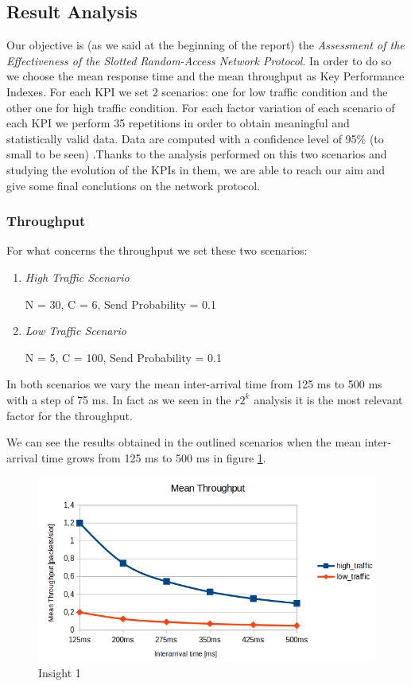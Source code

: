 \subsection{Result Analysis}
Our objective is (as we said at the beginning of the report) the \textit{Assessment of the Effectiveness of the Slotted Random-Access Network Protocol}. In order to do so we choose the mean response time and the mean throughput as Key Performance Indexes. For each KPI we set 2 scenarios: one for low traffic condition and the other one for high traffic condition. For each factor variation of each scenario of each KPI we perform 35 repetitions in order to obtain meaningful and statistically valid data. Data are computed with a confidence level of 95\% (to small to be seen) .Thanks to the analysis performed on this two scenarios and studying the evolution of the KPIs in them, we are able to reach our aim and give some final conclutions on the network protocol. 

\subsubsection{Throughput}
For what concerns the throughput we set these two scenarios:
\begin{enumerate}
	\item \textit{High Traffic Scenario}
	
	N = 30, C = 6, Send Probability = 0.1
	\item \textit{Low Traffic Scenario}
	
	N = 5, C = 100, Send Probability = 0.1
\end{enumerate}

\noindent In both scenarios we vary the mean inter-arrival time from 125 ms to 500 ms with a step of 75 ms. In fact as we seen in the $r2^k$ analysis it is the most relevant factor for the throughput. 

\noindent We can see the results obtained in the outlined scenarios when the mean inter-arrival time grows from 125 ms to 500 ms in figure \ref{img: insight1_throughput}.

\begin{figure}[H]
	\centering
	\includegraphics[width=\textwidth]{img/insight1_throughput.png}
	\caption{Insight 1}
	\label{img: insight1_throughput}
\end{figure}

